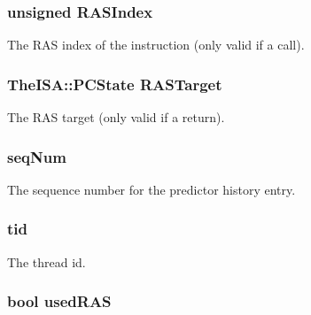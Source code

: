 \label{structBPredUnit_1_1PredictorHistory_aeb0915a8ec4bc79f84faf82333fcbca9}
\hypertarget{structBPredUnit_1_1PredictorHistory_a37b18bd15c135c050f48d643ba6d1264}{
\subsubsection[{RASIndex}]{\setlength{\rightskip}{0pt plus 5cm}unsigned {\bf RASIndex}}}
\label{structBPredUnit_1_1PredictorHistory_a37b18bd15c135c050f48d643ba6d1264}
The RAS index of the instruction (only valid if a call). \hypertarget{structBPredUnit_1_1PredictorHistory_a45fedf51b9f9857a0c4ee07d3967f6cc}{
\subsubsection[{RASTarget}]{\setlength{\rightskip}{0pt plus 5cm}TheISA::PCState {\bf RASTarget}}}
\label{structBPredUnit_1_1PredictorHistory_a45fedf51b9f9857a0c4ee07d3967f6cc}
The RAS target (only valid if a return). \hypertarget{structBPredUnit_1_1PredictorHistory_af9da73f56d2d0e7fd5009b70c4cf3542}{
\subsubsection[{seqNum}]{ {\bf seqNum}}}
\label{structBPredUnit_1_1PredictorHistory_af9da73f56d2d0e7fd5009b70c4cf3542}
The sequence number for the predictor history entry. \hypertarget{structBPredUnit_1_1PredictorHistory_aa508770268ee4ceaf16054b9e0be0e17}{
\subsubsection[{tid}]{ {\bf tid}}}
\label{structBPredUnit_1_1PredictorHistory_aa508770268ee4ceaf16054b9e0be0e17}
The thread id. \hypertarget{structBPredUnit_1_1PredictorHistory_a7238cdd6213db4fe8d76843a479b6690}{
\subsubsection[{usedRAS}]{\setlength{\rightskip}{0pt plus 5cm}bool {\bf usedRAS}}}
